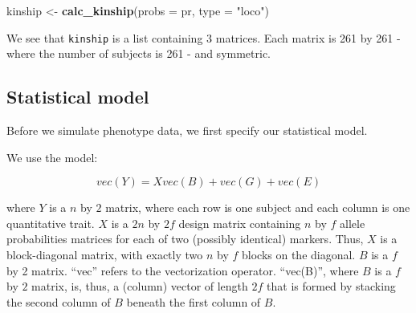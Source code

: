 \documentclass[oneside]{book}\usepackage[]{graphicx}\usepackage[]{color}
\newenvironment{Shaded}{\begin{snugshade}}{\end{snugshade}}
\newcommand{\CommentTok}[1]{\textcolor[rgb]{0.56,0.35,0.01}{\textit{#1}}}
\newcommand{\DataTypeTok}[1]{\textcolor[rgb]{0.13,0.29,0.53}{#1}}
\newcommand{\KeywordTok}[1]{\textcolor[rgb]{0.13,0.29,0.53}{\textbf{#1}}}
\newcommand{\NormalTok}[1]{#1}
\newcommand{\StringTok}[1]{\textcolor[rgb]{0.31,0.60,0.02}{#1}}
\begin{document}
\begin{Shaded}
\begin{Highlighting}[]
\NormalTok{kinship <-}\StringTok{ }\KeywordTok{calc_kinship}\NormalTok{(}\DataTypeTok{probs =}\NormalTok{ pr, }\DataTypeTok{type =} \StringTok{"loco"}\NormalTok{)}
\end{Highlighting}
\end{Shaded}

\begin{Shaded}
\end{Shaded}

We see that \texttt{kinship} is a list containing 3 matrices. Each
matrix is 261 by 261 - where the number of subjects is 261 - and
symmetric.

\hypertarget{statistical-model}{%
\subsection{Statistical model}\label{statistical-model}}

Before we simulate phenotype data, we first specify our statistical
model.

We use the model:

\[vec(Y) = X vec(B) + vec(G) + vec(E)\]

where \(Y\) is a \(n\) by \(2\) matrix, where each row is one subject
and each column is one quantitative trait. \(X\) is a \(2n\) by \(2f\)
design matrix containing \(n\) by \(f\) allele probabilities matrices
for each of two (possibly identical) markers. Thus, \(X\) is a
block-diagonal matrix, with exactly two \(n\) by \(f\) blocks on the
diagonal. \(B\) is a \(f\) by 2 matrix. ``vec'' refers to the
vectorization operator. ``vec(B)'', where \(B\) is a \(f\) by \(2\)
matrix, is, thus, a (column) vector of length \(2f\) that is formed by
stacking the second column of \(B\) beneath the first column of \(B\).
\end{document}

